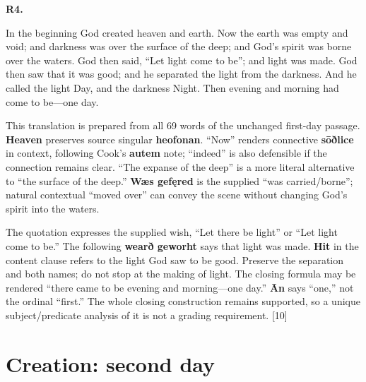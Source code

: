 \par\begin{minipage}{\linewidth}\raggedright
\textbf{R4.}

In the beginning God created heaven and earth. Now the earth was empty and void; and darkness was over the surface of the deep; and God's spirit was borne over the waters. God then said, “Let light come to be”; and light was made. God then saw that it was good; and he separated the light from the darkness. And he called the light Day, and the darkness Night. Then evening and morning had come to be—one day.

This translation is prepared from all 69 words of the unchanged first-day passage. \textbf{Heaven} preserves source singular \textbf{heofonan}. “Now” renders connective \textbf{sōðlice} in context, following Cook's \textbf{autem} note; “indeed” is also defensible if the connection remains clear. “The expanse of the deep” is a more literal alternative to “the surface of the deep.” \textbf{Wæs gefęred} is the supplied “was carried/\allowbreak{}borne”; natural contextual “moved over” can convey the scene without changing God's spirit into the waters.

The quotation expresses the supplied wish, “Let there be light” or “Let light come to be.” The following \textbf{wearð geworht} says that light was made. \textbf{Hit} in the content clause refers to the light God saw to be good. Preserve the separation and both names; do not stop at the making of light. The closing formula may be rendered “there came to be evening and morning—one day.” \textbf{Ān} says “one,” not the ordinal “first.” The whole closing construction remains supported, so a unique subject/\allowbreak{}predicate analysis of it is not a grading requirement. [10]

\end{minipage}\par\addvspace{4pt}

\section*{Creation: second day}

